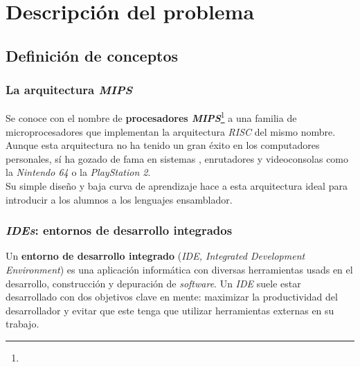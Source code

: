 \chapter{Descripción del problema} \label{ch:descripcion-del-problema}


\section{Definición de conceptos}\label{sec:definicion-de-conceptos}

\subsection{La arquitectura \textit{MIPS}}\label{subsec:la-arquitectura-mips}

Se   conoce con el nombre de \textbf{procesadores \textit{MIPS}}\footnote{}  a una familia de microprocesadores que implementan
la arquitectura \textit{RISC} del mismo nombre.
Aunque esta arquitectura no ha tenido un gran éxito en los computadores personales, sí ha gozado de fama en
sistemas , enrutadores y videoconsolas como la \textit{Nintendo 64} o la \textit{PlayStation 2}. \\

Su simple diseño y baja curva de aprendizaje hace a esta arquitectura ideal para introducir a los alumnos
a los lenguajes ensamblador.

\subsection{\textit{IDEs}: entornos de desarrollo integrados}\label{subsec:ides-entornos-de-desarrollo-integrados}

Un \textbf{entorno de desarrollo integrado} (\textit{IDE, Integrated Development Environment}) es una aplicación
informática con diversas herramientas usads en el desarrollo, construcción y depuración de \textit{software}.
Un \textit{IDE} suele estar desarrollado con dos objetivos clave en mente: maximizar la productividad del
desarrollador y evitar que este tenga que utilizar herramientas externas en su trabajo.

